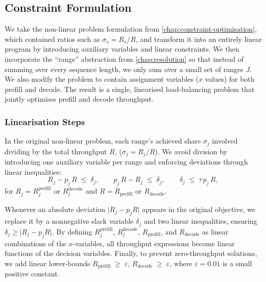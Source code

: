 \subsection{Constraint Formulation}
\label{chap:linear-problem}

We take the non-linear problem formulation from \autoref{chap:constraint-optimisation}, which contained ratios such as \(\sigma_s = R_s / R\), and transform it into an entirely linear program by introducing auxiliary variables and linear constraints.
We then incorporate the ``range'' abstraction from \autoref{chap:resolution} so that instead of summing over every sequence length, we only sum over a small set of ranges \(J\).
We also modify the problem to contain assignment variables (\(x\) values) for both prefill and decode.
The result is a single, linearised load-balancing problem that jointly optimises prefill and decode throughput.


\subsubsection{Linearisation Steps}
In the original non-linear problem, each range's achieved share \(\sigma_j\) involved dividing by the total throughput \(R\), (\(\sigma_j = R_j / R\)).
We avoid division by introducing one auxiliary variable per range and enforcing deviations through linear inequalities:
  \[
    R_{j} - p_j\,R \;\le\; \delta_j,\qquad
    p_j\,R - R_{j} \;\le\; \delta_j,\qquad
    \delta_j \;\le\; \tau\,p_j\,R,
  \]
  for \(R_j = R_{j}^{\mathrm{prefill}}\) or \(R_{j}^{\mathrm{decode}}\) and \(R = R_{\mathrm{prefill}}\) or \(R_{\mathrm{decode}}\).

Whenever an absolute deviation \(\lvert R_j - p_j R\rvert\) appears in the original objective, we replace it by a nonnegative slack variable \(\delta_j\) and two linear inequalities, ensuring \(\delta_j \ge \lvert R_j - p_j R\rvert\).
By defining \(R_{j}^{\mathrm{prefill}}\), \(R_{j}^{\mathrm{decode}}\), \(R_{\mathrm{prefill}}\), and \(R_{\mathrm{decode}}\) as linear combinations of the \(x\)-variables, all throughput expressions become linear functions of the decision variables.
Finally, to prevent zero-throughput solutions, we add linear lower-bounds \(R_{\mathrm{prefill}} \;\ge\; \varepsilon\), \(R_{\mathrm{decode}} \;\ge\; \varepsilon\), where \(\varepsilon=0.01\) is a small positive constant.

